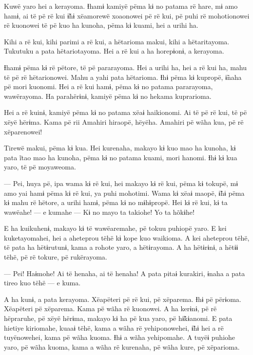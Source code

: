 Kuwë yaro hei a kerayoma. Ɨhamɨ kamiyë pëma kɨ no patama rë hare, mɨ amo
hamɨ, ai të pë rë kui ɨ̃hɨ xëamorewë xoaonowei pë rë kui, pë puhi rë
mohotionowei rë kuonowei të pë kuo ha kunoha, pëma kɨ kuami, hei a urihi
ha.

Kihi a rë kui, kihi parimi a rë kui, a hëtarioma makui, kihi a
hëtaritayoma. Tukutuku a pata hëtariotayoma. Hei a rë kui a ha
horepɨonɨ, a kerayoma.

Ɨhamɨ pëma kɨ rë pëtore, të pë pararayoma. Hei a urihi ha, hei a rë kui
ha, mahu të pë rë hëtarionowei. Mahu a yahi pata hëtarioma. Ɨhɨ pëma kɨ
kupropë, ɨ̃naha pë mori kuonomi. Hei a rë kui hamɨ, pëma kɨ no patama
pararayoma, wawërayoma. Ha parahërɨnɨ, kamiyë pëma kɨ no hekama
kuprarioma.

Hei a rë kuinɨ, kamiyë pëma kɨ no patama xëaɨ haikionomi. Ai të pë rë
kui, të pë xëyë hërɨma. Kama pë rii Amahiri hiraopë, hëyëha. Amahiri pë
wãha kua, pë rë xëparenowei!

Tirewë makui, pëma kɨ kua. Hei kurenaha, makayo kɨ kuo mao ha kunoha, kɨ
pata ĩtao mao ha kunoha, pëma kɨ no patama kuami, mori hanomi. Ɨhɨ kɨ
kua yaro, të pë moyaweoma.


--- Pei, huya pë, ipa wama kɨ rë kui, hei makayo kɨ rë kui, pëma kɨ
tokupë, mɨ amo yai hamɨ pëma kɨ rë kui, ya puhi mohotimi. Wama kɨ xëaɨ
maopë, ɨ̃hɨ pëma kɨ mahu rë hëtore, a urihi hamɨ, pëma kɨ no mɨhɨpropë.
Hei kɨ rë kui, kɨ ta wawëahe! --- e kumahe --- Kɨ no mayo ta takiohe! Yo
ta hõkɨhe!

E ha kuikuhenɨ, makayo kɨ të wawëaremahe, pë tokuu puhiopë yaro. E kei
kuketayomahei, hei a aheteprou tëhë kɨ kope kuo waikioma. A kei
aheteprou tëhë, të pata ha hëtɨrutunɨ, kama a rohote yaro, a hëtɨrayoma.
A ha hëtɨrɨnɨ, a hëtɨɨ tëhë, pë rë tokure, pë rukërayoma.

--- Pei! Haɨmohe! Ai të henaha, ai të henaha! A pata pitaɨ kurakiri,
ɨnaha a pata tireo kuo tëhë --- e kuma.

A ha kunɨ, a pata kerayoma. Xëapëteri pë rë kui, pë xëparema. Ɨhɨ pë
përɨoma. Xëapëteri pë xëparema. Kama pë wãha rë kuonowei. A ha kerɨnɨ,
pë rë hëpraruhe, pë xëyë hërɨma, makayo kɨ ha pë kua yaro, pë hɨ̃kɨanomi.
E pata hietiye kiriomahe, kuaaɨ tëhë, kama a wãha rë yehiponowehei, ɨ̃hɨ
hei a rë tuyënowehei, kama pë wãha kuoma. Ɨhɨ a wãha yehipomahe. A tuyëɨ
puhiohe yaro, pë wãha kuoma, kama a wãha rë kurenaha, pë wãha kure, pë
xëparioma.


